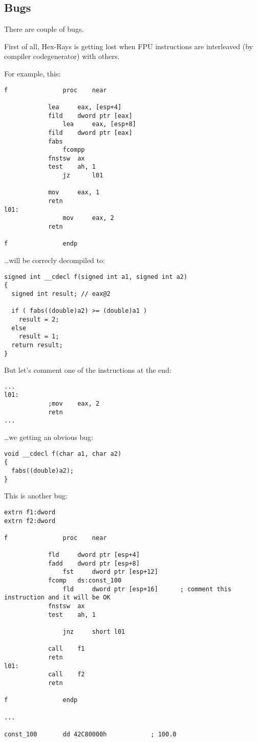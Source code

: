 \label{hex_rays}

\subsection{Bugs}

There are couple of bugs.

First of all, Hex-Rays is getting lost when \ac{FPU} instructions are interleaved (by compiler codegenerator) with others.

For example, this:

\begin{lstlisting}
f               proc    near

        	lea     eax, [esp+4]
	        fild    dword ptr [eax]
                lea     eax, [esp+8]
        	fild    dword ptr [eax]
	        fabs
                fcompp
        	fnstsw  ax
	        test    ah, 1
                jz      l01

        	mov     eax, 1
	        retn
l01:
                mov     eax, 2
	        retn

f               endp
\end{lstlisting}

\dots will be correcly decompiled to:

\begin{lstlisting}
signed int __cdecl f(signed int a1, signed int a2)
{
  signed int result; // eax@2

  if ( fabs((double)a2) >= (double)a1 )
    result = 2;
  else
    result = 1;
  return result;
}
\end{lstlisting}

But let's comment one of the instructions at the end:

\begin{lstlisting}
...
l01:
	        ;mov    eax, 2
        	retn
...
\end{lstlisting}

\dots we getting an obvious bug:

\begin{lstlisting}
void __cdecl f(char a1, char a2)
{
  fabs((double)a2);
}
\end{lstlisting}

This is another bug:

\begin{lstlisting}
extrn f1:dword
extrn f2:dword

f               proc    near

	        fld     dword ptr [esp+4]
        	fadd    dword ptr [esp+8]
                fst     dword ptr [esp+12]
	        fcomp   ds:const_100
                fld     dword ptr [esp+16]      ; comment this instruction and it will be OK
	        fnstsw  ax
        	test    ah, 1

                jnz     short l01

	        call    f1
        	retn
l01:
	        call    f2
        	retn

f               endp

...

const_100       dd 42C80000h            ; 100.0
\end{lstlisting}

